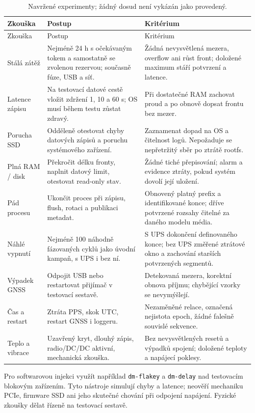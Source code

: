 \documentclass[11pt,a4paper]{article}
\begin{document}
{\small
\begin{longtable}{L{29mm}L{58mm}L{60mm}}
\caption{Navržené experimenty; žádný dosud není vykázán jako provedený.}\\
\toprule Zkouška & Postup & Kritérium\\\midrule\endfirsthead
\toprule Zkouška & Postup & Kritérium\\\midrule\endhead
Stálá zátěž & Nejméně 24 h s očekávaným tokem a samostatně se zvolenou rezervou; současně fúze, USB a síť. & Žádná nevysvětlená mezera, overflow ani růst front; doložené maximum stáří potvrzení a latence.\\\addlinespace
Latence zápisu & Na testovací datové cestě vložit zdržení 1, 10 a 60 s; OS musí během testu zůstat zdravý. & Při dostatečné RAM zachovat proud a po obnově dopsat frontu bez mezer.\\\addlinespace
Porucha SSD & Odděleně otestovat chyby datových zápisů a poruchu systémového zařízení. & Zaznamenat dopad na OS a čitelnost logů. Nepožaduje se nepřetržitý sběr po ztrátě rootfs.\\\addlinespace
Plná RAM / disk & Překročit délku fronty, naplnit datový limit, otestovat read-only stav. & Žádné tiché přepisování; alarm a evidence ztráty, pokud systém dovolí její uložení.\\\addlinespace
Pád procesu & Ukončit proces při zápisu, flush, rotaci a publikaci metadat. & Obnovený platný prefix a identifikované konce; dříve potvrzené rozsahy čitelné za daného modelu média.\\\addlinespace
Náhlé vypnutí & Nejméně 100 náhodně fázovaných cyklů jako úvodní kampaň, s UPS i bez ní. & S UPS dokončení definovaného konce; bez UPS změřené ztrátové okno a zachování starších potvrzených segmentů.\\\addlinespace
Výpadek GNSS & Odpojit USB nebo restartovat přijímač v testovací sestavě. & Detekovaná mezera, korektní obnova příjmu; chybějící vzorky se nevymýšlejí.\\\addlinespace
Čas a restart & Ztráta PPS, skok UTC, restart GNSS i loggeru. & Nezaměněné relace, označená nejistota epoch, žádné falešně souvislé sekvence.\\\addlinespace
Teplo a vibrace & Uzavřený kryt, dlouhý zápis, radio/DC/DC aktivní, mechanická zkouška. & Bez nevysvětlených resetů a výpadků spojení; doložené teploty a napájecí poklesy.\\
\bottomrule\end{longtable}}

Pro softwarovou injekci využít například \texttt{dm-flakey} a \texttt{dm-delay} nad testovacím blokovým zařízením. Tyto nástroje simulují chyby a latence; neověří mechaniku PCIe, firmware SSD ani jeho skutečné chování při odpojení napájení.\cite{dm} Fyzické zkoušky dělat řízeně na testovací sestavě.
\end{document}
